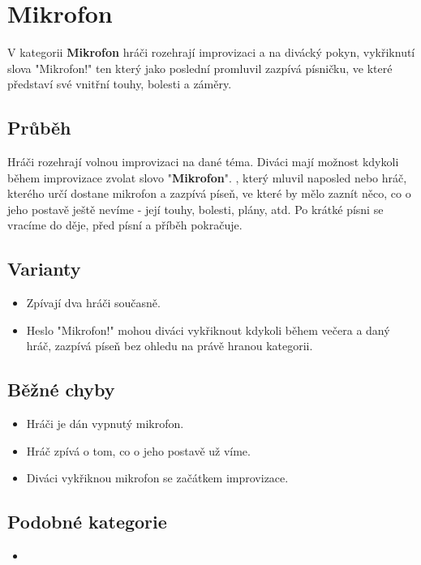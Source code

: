 \documentclass[main.tex]{subfiles}
\begin{document}
 
 
 
 
\needspace{5cm} \section{Mikrofon} \label{mikrofon}  
 
 
V kategorii \textbf{Mikrofon}{} hráči rozehrají improvizaci a na divácký pokyn, vykřiknutí slova "Mikrofon!"{} ten který jako poslední promluvil zazpívá písničku, ve které představí své vnitřní touhy, bolesti a záměry. 
 
 
\subsection{Průběh} Hráči rozehrají volnou improvizaci na dané téma. Diváci mají možnost kdykoli během improvizace zvolat slovo "\textbf{Mikrofon}{}". , který mluvil naposled nebo hráč, kterého určí  dostane mikrofon a zazpívá píseň, ve které by mělo zaznít něco, co o jeho postavě ještě nevíme - její touhy, bolesti, plány, atd. Po krátké písni se vracíme do děje, před písní a příběh pokračuje.  
 
\subsection{ Varianty } \begin{itemize}
\item Zpívají dva hráči současně.
\item Heslo "Mikrofon!"{} mohou diváci vykřiknout kdykoli během večera a daný hráč, zazpívá píseň bez ohledu na právě hranou kategorii.
\end{itemize}
 
\subsection{ Běžné chyby } \begin{itemize}
\item Hráči je dán vypnutý mikrofon.
\item Hráč zpívá o tom, co o jeho postavě už víme.
\item Diváci vykřiknou mikrofon se začátkem improvizace.
\end{itemize}
 
 
\subsection{ Podobné kategorie } \begin{itemize}
\item {}
\end{itemize}
 
\end{document}
